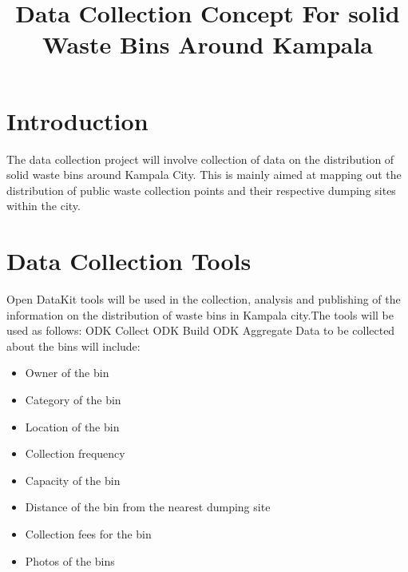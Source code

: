 \documentclass[a4paper,12pt]{article}
\begin{document}
\title{Data Collection Concept For solid Waste Bins Around Kampala}
\maketitle
\section{Introduction}
The data collection project will involve collection of data on the distribution of solid waste bins around Kampala City. This is mainly aimed at mapping out the distribution of public waste collection points and their respective dumping sites within the city.

\section{Data Collection Tools}
Open DataKit tools will be used in the collection, analysis and publishing of the information on the distribution of waste bins in Kampala city.The tools will be used as follows:
ODK Collect
ODK Build
ODK Aggregate
Data to be collected about the bins will include:
\begin{itemize}
  \item Owner of the bin
  \item Category of the bin
  \item Location of the bin
  \item Collection frequency
  \item Capacity of the bin
  \item Distance of the bin from the nearest dumping site
  \item Collection fees for the bin
  \item Photos of the bins
  
\end{itemize}
\end{document}
